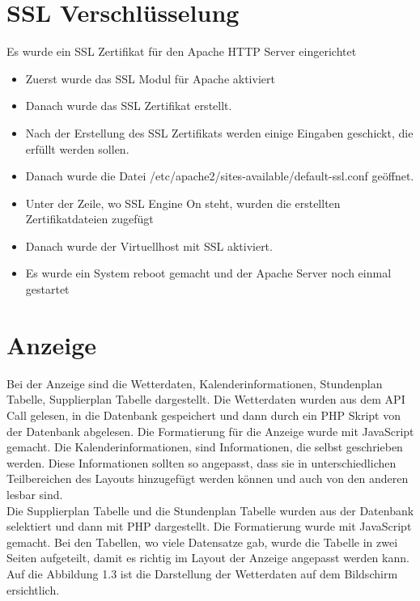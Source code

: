 \section{SSL Verschlüsselung}
Es wurde ein SSL Zertifikat für den Apache HTTP Server eingerichtet 
\begin{itemize}
	\item Zuerst wurde das SSL Modul für Apache aktiviert
\end{itemize}
\begin{itemize}
	\item Danach wurde das SSL Zertifikat erstellt. 
\end{itemize}
\begin{itemize}
	\item Nach der Erstellung des SSL Zertifikats werden einige Eingaben geschickt, die erfüllt werden sollen. 
\end{itemize}
\begin{itemize}
	\item Danach wurde die Datei /etc/apache2/sites-available/default-ssl.conf geöffnet.
\end{itemize}
\begin{itemize}
	\item Unter der Zeile, wo SSL Engine On steht, wurden die erstellten Zertifikatdateien zugefügt
\end{itemize}
\begin{itemize}
	\item Danach wurde der Virtuellhost mit SSL aktiviert. 
\end{itemize}
\begin{itemize}
	\item Es wurde ein System reboot gemacht und der Apache Server noch einmal gestartet \cite{50_SSS}
\end{itemize}
\section{Anzeige}
Bei der Anzeige sind die Wetterdaten, Kalenderinformationen, Stundenplan Tabelle, Supplierplan Tabelle dargestellt. Die Wetterdaten wurden aus dem API Call gelesen, in die Datenbank gespeichert und dann durch ein PHP Skript von der Datenbank abgelesen. Die Formatierung für die Anzeige wurde mit JavaScript gemacht. Die Kalenderinformationen, sind Informationen, die selbst geschrieben werden. Diese Informationen sollten so angepasst, dass sie in unterschiedlichen Teilbereichen des Layouts hinzugefügt werden können und auch von den anderen lesbar sind. \\
Die Supplierplan Tabelle und die Stundenplan Tabelle wurden aus der Datenbank selektiert und dann mit PHP dargestellt. Die Formatierung wurde mit JavaScript gemacht. Bei den Tabellen, wo viele Datensatze gab, wurde die Tabelle in zwei Seiten aufgeteilt, damit es richtig im Layout der Anzeige angepasst werden kann. Auf die Abbildung 1.3 ist die Darstellung der Wetterdaten auf dem Bildschirm ersichtlich. \\

